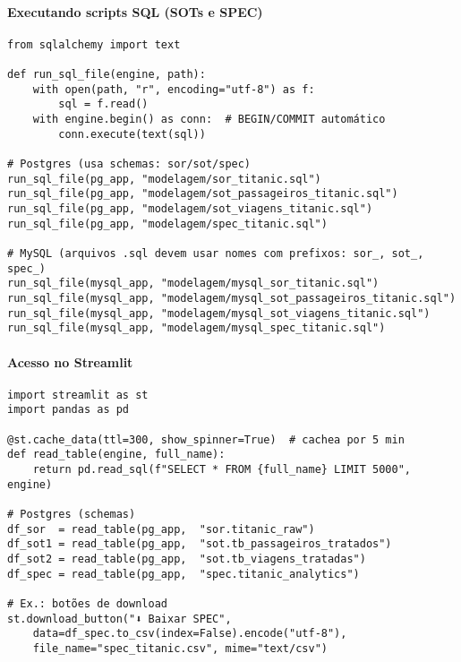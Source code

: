 \documentclass[12pt,a4paper]{article}
\begin{document}
\paragraph{Executando scripts SQL (SOTs e SPEC)}
\begin{verbatim}
from sqlalchemy import text

def run_sql_file(engine, path):
    with open(path, "r", encoding="utf-8") as f:
        sql = f.read()
    with engine.begin() as conn:  # BEGIN/COMMIT automático
        conn.execute(text(sql))

# Postgres (usa schemas: sor/sot/spec)
run_sql_file(pg_app, "modelagem/sor_titanic.sql")
run_sql_file(pg_app, "modelagem/sot_passageiros_titanic.sql")
run_sql_file(pg_app, "modelagem/sot_viagens_titanic.sql")
run_sql_file(pg_app, "modelagem/spec_titanic.sql")

# MySQL (arquivos .sql devem usar nomes com prefixos: sor_, sot_, spec_)
run_sql_file(mysql_app, "modelagem/mysql_sor_titanic.sql")
run_sql_file(mysql_app, "modelagem/mysql_sot_passageiros_titanic.sql")
run_sql_file(mysql_app, "modelagem/mysql_sot_viagens_titanic.sql")
run_sql_file(mysql_app, "modelagem/mysql_spec_titanic.sql")
\end{verbatim}

\paragraph{Acesso no Streamlit}
\begin{verbatim}
import streamlit as st
import pandas as pd

@st.cache_data(ttl=300, show_spinner=True)  # cachea por 5 min
def read_table(engine, full_name):
    return pd.read_sql(f"SELECT * FROM {full_name} LIMIT 5000", engine)

# Postgres (schemas)
df_sor  = read_table(pg_app,  "sor.titanic_raw")
df_sot1 = read_table(pg_app,  "sot.tb_passageiros_tratados")
df_sot2 = read_table(pg_app,  "sot.tb_viagens_tratadas")
df_spec = read_table(pg_app,  "spec.titanic_analytics")

# Ex.: botões de download
st.download_button("⬇️ Baixar SPEC",
    data=df_spec.to_csv(index=False).encode("utf-8"),
    file_name="spec_titanic.csv", mime="text/csv")
\end{verbatim}
\end{document}
